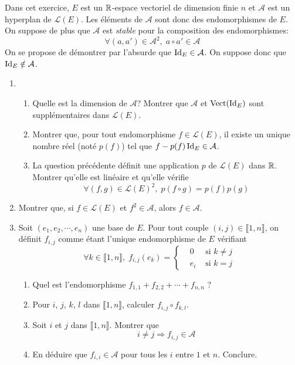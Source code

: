 Dans cet exercice, $E$ est un $\mathbb{R}$-espace vectoriel de dimension finie $n$ et $\mathcal{A}$ est un hyperplan de $\mathcal{L}(E)$. Les éléments de $\mathcal{A}$ sont donc des endomorphismes de $E$.\newline
On suppose de plus que $\mathcal{A}$ est \emph{stable} pour la composition des endomorphismes:
\begin{displaymath}
  \forall (a,a')\in \mathcal{A}^2,\; a\circ a' \in \mathcal{A}
\end{displaymath}
On se propose de démontrer par l'absurde que $\operatorname{Id}_E\in \mathcal{A}$. On suppose donc que $\operatorname{Id}_E\notin \mathcal{A}$.
\begin{enumerate}
  \item 
\begin{enumerate}
  \item Quelle est la dimension de $\mathcal{A}$? Montrer que $\mathcal{A}$ et $\operatorname{Vect}(\operatorname{Id}_E)$ sont supplémentaires dans $\mathcal{L}(E)$.
  \item Montrer que, pour tout endomorphisme $f\in \mathcal{L}(E)$, il existe un unique nombre réel (noté $p(f)$) tel que $f - p(f)\operatorname{Id}_E \in \mathcal{A}$.
  \item La question précédente définit une application $p$ de $\mathcal{L}(E)$ dans $\mathbb{R}$. Montrer qu'elle est linéaire et qu'elle vérifie
\begin{displaymath}
  \forall(f,g)\in \mathcal{L}(E)^2,\; p(f\circ g) = p(f) p(g)
\end{displaymath}
\end{enumerate}

  \item Montrer que, si $f\in \mathcal{L}(E)$ et $f^2 \in \mathcal{A}$, alors $f\in \mathcal{A}$.
  
  \item Soit $(e_1,e_2, \cdots, e_n)$ une base de $E$. Pour tout couple $(i,j)\in \llbracket 1,n \rrbracket$, on définit $f_{i,j}$ comme étant l'unique endomorphisme de $E$ vérifiant
\begin{displaymath}
\forall k \in \llbracket 1, n \rrbracket, \;
f_{i,j}(e_k)=
\left\lbrace 
\begin{aligned}
  &0   &\text{ si } k\neq j \\
  &e_i &\text{ si } k = j
\end{aligned}
\right. 
\end{displaymath}
\begin{enumerate}
  \item Quel est l'endomorphisme $f_{1,1} + f_{2,2} + \cdots + f_{n,n}$ ?
  \item Pour $i$, $j$, $k$, $l$ dans $\llbracket 1,n \rrbracket$, calculer $f_{i,j} \circ f_{k,l}$.
  \item Soit $i$ et $j$ dans $\llbracket 1,n \rrbracket$. Montrer que 
\begin{displaymath}
  i \neq j \Rightarrow f_{i,j} \in \mathcal{A}
\end{displaymath}
  \item En déduire que $f_{i,i}\in \mathcal{A}$ pour tous les $i$ entre $1$ et $n$. Conclure.
\end{enumerate}

\end{enumerate}
